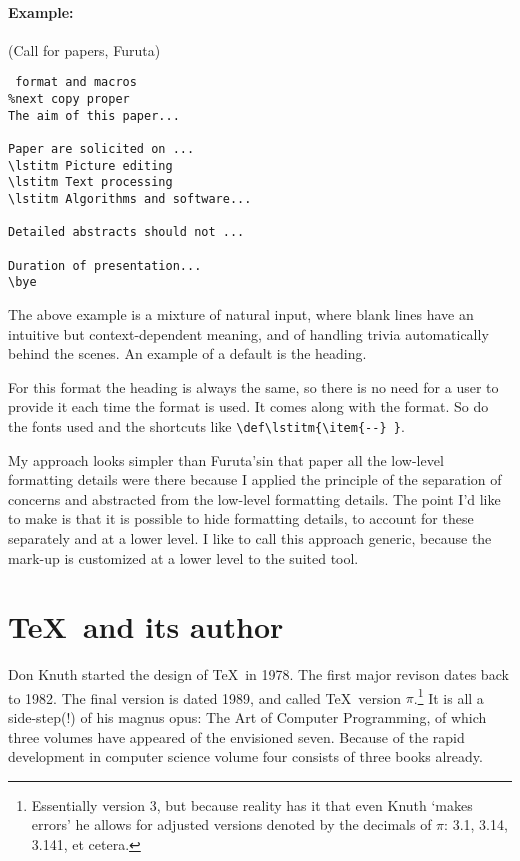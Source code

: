\paragraph*{Example:}(Call for papers, Furuta)
\begingroup\small\begin{verbatim}
 format and macros
%next copy proper
The aim of this paper...

Paper are solicited on ...
\lstitm Picture editing
\lstitm Text processing
\lstitm Algorithms and software...

Detailed abstracts should not ...

Duration of presentation...
\bye
\end{verbatim}\endgroup
The above example is a mixture of natural input, where blank lines
have an intuitive but context-dependent meaning, and of
handling trivia automatically behind the scenes.
An example of a default is the heading.

For this format the heading is always the same,
so there is no need for a user to provide it each time the format
is used. It comes along with the format.
So do the fonts used and the shortcuts
like \verb|\def\lstitm{\item{--} }|.

My approach looks simpler than Furuta's\Dash in that paper all the low-level
  formatting details were there\Dash
because I applied the principle of the separation of concerns
and abstracted from the low-level formatting details.
The point I'd like to make is that it is possible to hide
formatting details, to account for these separately and at a lower level.
I like to call this approach generic, because the mark-up is customized
at a lower level to the suited tool.

\section{\TeX\ and its author}
Don Knuth started the design of \TeX\ in 1978.
The first major revison  dates back to  1982.
The final version is dated 1989, and called \TeX\ version $\pi$.\footnote{%
   Essentially version 3, but because reality has it that even Knuth
   `makes errors' he allows for adjusted versions denoted by the decimals of
   $\pi$: 3.1, 3.14, 3.141, et cetera.}
It is all a side-step(!) of his magnus opus: The Art of Computer Programming,
of which three volumes have appeared of the envisioned seven.
Because of the rapid development in computer science volume four consists of
three books already.

